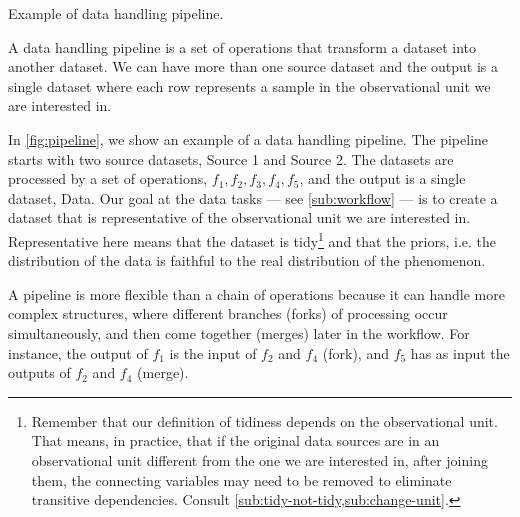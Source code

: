 \begin{figurebox}[label=fig:pipeline]{Example of data handling pipeline.}
  \centering
  \tcblower
  A data handling pipeline is a set of operations that transform a dataset into
  another dataset.  We can have more than one source dataset and the output is a single
  dataset where each row represents a sample in the observational unit we are interested
  in.
\end{figurebox}

In \cref{fig:pipeline}, we show an example of a data handling pipeline.  The pipeline
starts with two source datasets, Source 1 and Source 2.  The datasets are processed by a
set of operations, $f_1, f_2, f_3, f_4, f_5$, and the output is a single dataset,
Data.  Our goal at the data tasks --- see \cref{sub:workflow} --- is to create a dataset
that is representative of the observational unit we are interested in.  Representative
here means that the dataset is tidy\footnote{Remember that our definition of tidiness
depends on the observational unit.  That means, in practice, that if the original data
sources are in an observational unit different from the one we are interested in, after
joining them, the connecting variables may need to be removed to eliminate transitive
dependencies.  Consult \cref{sub:tidy-not-tidy,sub:change-unit}.} and that the priors,
i.e. the distribution of the data is faithful to the real distribution of the phenomenon.

A pipeline is more flexible than a chain of operations because it can handle more complex
structures, where different branches (forks) of processing occur simultaneously, and then
come together (merges) later in the workflow.  For instance, the output of $f_1$ is the
input of $f_2$ and $f_4$ (fork), and $f_5$ has as input the outputs of $f_2$ and $f_4$
(merge).

